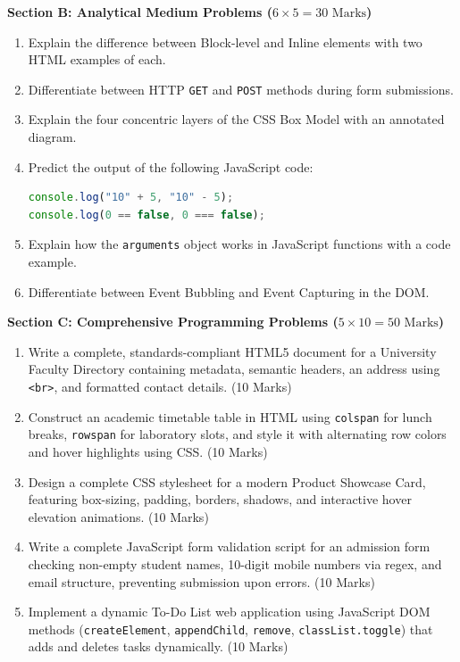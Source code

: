 \begin{mockexam}
\medskip
\noindent\textbf{Section B: Analytical Medium Problems ($6 \times 5 = 30\text{ Marks}$)}
\begin{enumerate}[leftmargin=1.5em, start=11]
    \item Explain the difference between Block-level and Inline elements with two HTML examples of each.
    \item Differentiate between HTTP \texttt{GET} and \texttt{POST} methods during form submissions.
    \item Explain the four concentric layers of the CSS Box Model with an annotated diagram.
    \item Predict the output of the following JavaScript code:
    \begin{lstlisting}[language=JavaScript]
console.log("10" + 5, "10" - 5);
console.log(0 == false, 0 === false);
    \end{lstlisting}
    \item Explain how the \texttt{arguments} object works in JavaScript functions with a code example.
    \item Differentiate between Event Bubbling and Event Capturing in the DOM.
\end{enumerate}

\medskip
\noindent\textbf{Section C: Comprehensive Programming Problems ($5 \times 10 = 50\text{ Marks}$)}
\begin{enumerate}[leftmargin=1.5em, start=17]
    \item Write a complete, standards-compliant HTML5 document for a University Faculty Directory containing metadata, semantic headers, an address using \texttt{<br>}, and formatted contact details. (10 Marks)
    \item Construct an academic timetable table in HTML using \texttt{colspan} for lunch breaks, \texttt{rowspan} for laboratory slots, and style it with alternating row colors and hover highlights using CSS. (10 Marks)
    \item Design a complete CSS stylesheet for a modern Product Showcase Card, featuring box-sizing, padding, borders, shadows, and interactive hover elevation animations. (10 Marks)
    \item Write a complete JavaScript form validation script for an admission form checking non-empty student names, 10-digit mobile numbers via regex, and email structure, preventing submission upon errors. (10 Marks)
    \item Implement a dynamic To-Do List web application using JavaScript DOM methods (\texttt{createElement}, \texttt{appendChild}, \texttt{remove}, \texttt{classList.toggle}) that adds and deletes tasks dynamically. (10 Marks)
\end{enumerate}
\end{mockexam}

